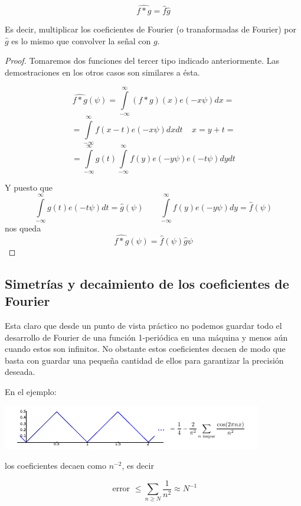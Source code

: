\begin{prop}
	\[\widehat{f*g} = \hat{f} \hat{g}\]

	Es decir, multiplicar los coeficientes de Fourier (o tranaformadas de Fourier) por $\hat{g}$ es lo mismo que convolver la señal con $g$.

\end{prop}

\begin{proof}
Tomaremos dos funciones del tercer tipo indicado anteriormente. Las demostraciones en los otros casos son similares a ésta.

$$ \widehat{f*g}(\psi) = \int\limits^{\infty}_{-\infty} (f*g)(x) e(-x\psi)dx =$$
$$ = \int\limits^{\infty}_{-\infty} f(x - t) e (-x \psi) dx dt \;\;\;\; x = y + t=$$
$$ = \int\limits^{\infty}_{-\infty} g(t) \int\limits^{\infty}_{-\infty} f(y) e (-y \psi) e(-t\psi)dy dt$$

Y puesto que
$$ \int\limits^{\infty}_{-\infty} g(t) e(-t\psi) dt = \hat{g}(\psi) \;\;\;\;\;\;\; \int\limits^{\infty}_{-\infty} f(y) e (-y \psi) dy = \hat{f}(\psi) $$
nos queda
$$\widehat{f*g} (\psi) = \hat{f}(\psi) \hat{g}\psi $$

\end{proof}

\subsection{Simetrías y decaimiento de los coeficientes de Fourier}

Esta claro que desde un punto de vista práctico no podemos guardar todo el desarrollo de Fourier de una función 1-periódica en una máquina y menos aún cuando estos son infinitos. No obstante estos coeficientes decaen de modo que basta con guardar una pequeña cantidad de ellos para garantizar la precisión deseada.

En el ejemplo:

\begin{center}
\includegraphics[width=\linewidth]{img/ejemplo_decaimiento.png}
\end{center}

los coeficientes decaen como $n^{-2}$, es decir

\[ \text{ error } \leq \sum_{n \geq N} \frac{1}{n^2}  ≈ N^{-1} \]

